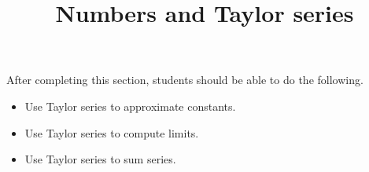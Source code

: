 \documentclass{ximera}
\title{Numbers and Taylor series}
\begin{document}
\begin{abstract}
\end{abstract}

\maketitle

\begin{sectionOutcomes}

After completing this section, students should be able to do the following.

\begin{itemize}
\item Use Taylor series to approximate constants.
\item Use Taylor series to compute limits.
\item Use Taylor series to sum series.
\end{itemize}

\end{sectionOutcomes}
\end{document}
